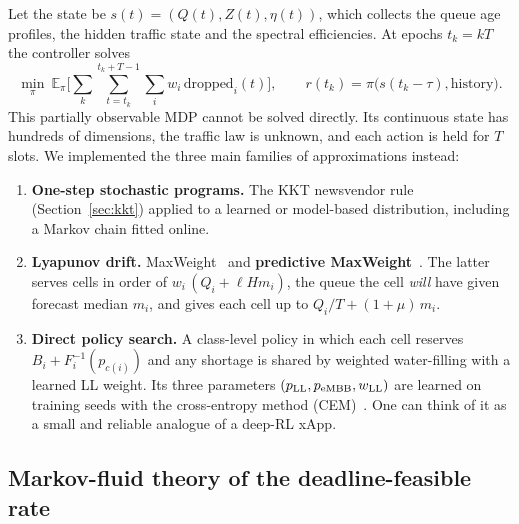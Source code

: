 Let the state be $s(t) = (Q(t), Z(t), \eta(t))$, which collects the queue age profiles, the hidden traffic state and the spectral efficiencies. At epochs $t_k = kT$ the controller solves
\begin{equation}
  \min_{\pi}\ \mathbb{E}_\pi\Big[\sum_k \sum_{t=t_k}^{t_k+T-1} \sum_i w_i\,\mathrm{dropped}_i(t)\Big],
  \qquad r(t_k) = \pi\big(s(t_k - \tau),\text{history}\big).
\end{equation}
This partially observable MDP cannot be solved directly. Its continuous state has hundreds of dimensions, the traffic law is unknown, and each action is held for $T$ slots. We implemented the three main families of approximations instead:
\begin{enumerate}
  \item \textbf{One-step stochastic programs.} The KKT newsvendor rule (Section~\ref{sec:kkt}) applied to a learned or model-based distribution, including a Markov chain fitted online.
  \item \textbf{Lyapunov drift.} MaxWeight~\cite{tassiulas1992} and \textbf{predictive MaxWeight}~\cite{huang2016}. The latter serves cells in order of $w_i\,(Q_i + \ell H m_i)$, the queue the cell \emph{will} have given forecast median $m_i$, and gives each cell up to $Q_i/T + (1+\mu)\,m_i$.
  \item \textbf{Direct policy search.} A class-level policy in which each cell reserves $B_i + F_i^{-1}(p_{c(i)})$ and any shortage is shared by weighted water-filling with a learned LL weight. Its three parameters $(p_{\rm LL}, p_{\rm eMBB}, w_{\rm LL})$ are learned on training seeds with the cross-entropy method (CEM)~\cite{rubinstein1999}. One can think of it as a small and reliable analogue of a deep-RL xApp.
\end{enumerate}

\subsection{Markov-fluid theory of the deadline-feasible rate}

